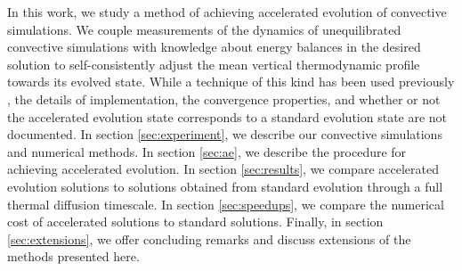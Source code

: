 \documentclass[aps, pre, onecolumn, nofootinbib, notitlepage, groupedaddress, amsfonts, amssymb, amsmath, longbibliography]{revtex4-1}
\begin{document}
In this work, we study a method of achieving accelerated evolution of
convective simulations. We couple measurements of the dynamics of unequilibrated
convective simulations with knowledge about energy balances in the desired solution
to self-consistently adjust the mean vertical thermodynamic profile towards its evolved state. 
While a technique of this kind has been used previously \cite{hurlburt&all1986},
the details of implementation, the convergence properties, and whether or not the
accelerated evolution state corresponds to a standard evolution state are not documented.
In section \ref{sec:experiment}, we describe our convective simulations and
numerical methods. In section \ref{sec:ae}, we describe the procedure for 
achieving accelerated evolution. In
section \ref{sec:results}, we compare accelerated evolution solutions
to solutions obtained from standard evolution through a full thermal diffusion timescale. 
In section \ref{sec:speedups}, we compare the numerical cost of accelerated
solutions to standard solutions.
Finally,
in section \ref{sec:extensions}, we offer concluding remarks and
discuss extensions of the methods presented here.


\end{document}
